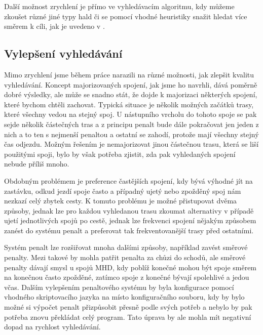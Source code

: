 Další možnost zrychlení je přímo ve vyhledávacím algoritmu, kdy můžeme zkoušet
různé jiné typy hald či se pomocí vhodné heuristiky snažit hledat více směrem k
cíli, jak je uvedeno v \cite{mj-ga}.

\subsection{Vylepšení vyhledávání}
Mimo zrychlení jsme během práce narazili na různé možnosti, jak zlepšit kvalitu
vyhledávání. Koncept majorizovaných spojení, jak jsme ho navrhli, dává poměrně
dobré výsledky, ale může se snadno stát, že dojde k majorizaci některých
spojení, které bychom chtěli zachovat. Typická situace je několik možných
začátků trasy, které všechny vedou na stejný spoj. U nástupního vrcholu do
tohoto spoje se pak sejde několik částečných tras a z principu penalt bude dále
pokračovat jen jeden z nich a to ten s nejmenší penaltou a ostatní se zahodí,
protože mají všechny stejný čas odjezdu. Možným řešením je nemajorizovat jinou
částečnou trasu, která se liší použitými spoji, bylo by však potřeba zjistit,
zda pak vyhledaných spojení nebude příliš mnoho.  

Obdobným problémem je preference častějších spojení, kdy bývá výhodné jít na
zastávku, odkud jezdí spoje často a případný ujetý nebo zpožděný spoj nám
nezkazí celý zbytek cesty. K tomuto problému je možné přistupovat dvěma způsoby,
jednak lze pro každou vyhledanou trasu zkoumat alternativy v případě ujetí
jednotlivých spojů po cestě, jednak lze frekvenci spojení nějakým způsobem
zanést do systému penalt a preferovat tak frekventovanější trasy před ostatními. 

Systém penalt lze rozšiřovat mnoha dalšími způsoby, například zavést směrové
penalty. Mezi takové by mohla patřit penalta za chůzi do schodů, ale směrové
penalty dávají smysl u spojů MHD, kdy poblíž konečné mohou být spoje směrem na
konečnou často zpožděné, zatímco spoje z konečné bývají spolehlivé a jedou včas.
Dalším vylepšením penaltového systému by byla konfigurace pomocí vhodného
skriptovacího jazyka na místo konfiguračního souboru, kdy by bylo možné si
výpočet penalt přizpůsobit přesně podle svých potřeb a nebylo by pak potřeba
znovu překládat celý program. Tato úprava by ale mohla mít negativní dopad na
rychlost vyhledávání.

